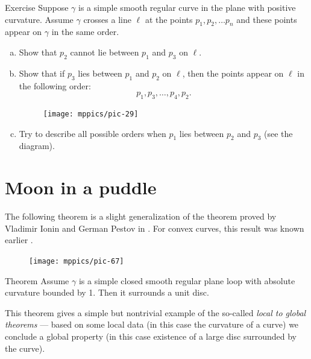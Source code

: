 \begin{thm}{Exercise}\label{ex:line-curve-intersections}
Suppose $\gamma$ is a simple smooth regular curve in the plane with positive curvature.
Assume $\gamma$ crosses a line $\ell$ at the points $p_1,p_2,\dots p_n$ and these points appear on $\gamma$ in the same order.
\begin{enumerate}[(a)]

\item\label{ex:line-curve-intersections:a} Show that $p_2$ cannot lie between $p_1$ and $p_3$ on $\ell$.

\item\label{ex:line-curve-intersections:b} Show that if $p_3$ lies between $p_1$ and $p_2$ on $\ell$, then the points appear on $\ell$ in the following order:  
\[p_1,p_3,\dots,p_4 ,p_2.\]

\begin{figure}[h!]
\vskip-0mm
\centering
\texttt{[image: mppics/pic-29]}
\vskip0mm
\end{figure}

\item Try to describe all possible orders when $p_1$ lies between $p_2$ and $p_3$ (see the diagram).

\end{enumerate}
\end{thm}

\section*{Moon in a puddle}

The following theorem is a slight generalization of the theorem proved by Vladimir Ionin and German Pestov in \cite{pestov-ionin}.
For convex curves, this result was known earlier \cite[\S 24]{blaschke}.


\begin{figure}
\vskip-0mm
\centering
\texttt{[image: mppics/pic-67]}
\vskip0mm
\end{figure}

\begin{thm}{Theorem}\label{thm:moon-orginal}
Assume $\gamma$ is a simple closed smooth regular plane loop with absolute curvature bounded by 1.
Then it surrounds a unit disc.
\end{thm}

This theorem gives a simple but nontrivial example of the so-called \emph{local to global theorems} --- based on some local data (in this case the curvature of a curve) we conclude a global property (in this case existence of a large disc surrounded by the curve).

